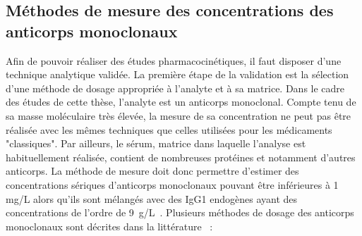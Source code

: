 \subsection{Méthodes de mesure des concentrations des anticorps monoclonaux}
Afin de pouvoir réaliser des études pharmacocinétiques, il faut disposer d'une technique analytique validée. La première étape de la validation est la sélection d'une méthode de dosage appropriée à l'analyte et à sa matrice. Dans le cadre des études de cette thèse, l'analyte est un anticorps monoclonal. Compte tenu de sa masse moléculaire très élevée, la mesure de sa concentration ne peut pas être réalisée avec les mêmes techniques que celles utilisées pour les médicaments "classiques". Par ailleurs, le sérum, matrice dans laquelle l'analyse est habituellement réalisée, contient de nombreuses protéines et notamment d'autres anticorps. La méthode de mesure doit donc permettre d'estimer des concentrations sériques d'anticorps monoclonaux pouvant être inférieures à 1 mg/L alors qu'ils sont mélangés avec des IgG1 endogènes ayant des concentrations de l'ordre de 9~g/L~\citep{REF90}. Plusieurs méthodes de dosage des anticorps monoclonaux sont décrites dans la littérature~\citep{REF91} :

